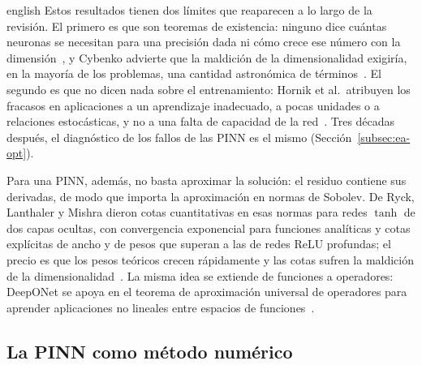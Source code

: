 \documentclass[0000.tex]{subfiles}
\begin{document}
\begin{hyphenrules}{english}
Estos resultados tienen dos límites que reaparecen a lo largo de la revisión. El primero es que son teoremas de existencia: ninguno dice cuántas neuronas se necesitan para una precisión dada ni cómo crece ese número con la dimensión~\cite{hornik1989multilayer,leshno1993multilayer}, y Cybenko advierte que la maldición de la dimensionalidad exigiría, en la mayoría de los problemas, una cantidad astronómica de términos~\cite{cybenko1989approximation}. El segundo es que no dicen nada sobre el entrenamiento: Hornik et al.\ atribuyen los fracasos en aplicaciones a un aprendizaje inadecuado, a pocas unidades o a relaciones estocásticas, y no a una falta de capacidad de la red~\cite{hornik1989multilayer}. Tres décadas después, el diagnóstico de los fallos de las PINN es el mismo (Sección~\ref{subsec:ea-opt}).

Para una PINN, además, no basta aproximar la solución: el residuo contiene sus derivadas, de modo que importa la aproximación en normas de Sobolev. De Ryck, Lanthaler y Mishra dieron cotas cuantitativas en esas normas para redes $\tanh$ de dos capas ocultas, con convergencia exponencial para funciones analíticas y cotas explícitas de ancho y de pesos que superan a las de redes ReLU profundas; el precio es que los pesos teóricos crecen rápidamente y las cotas sufren la maldición de la dimensionalidad~\cite{de2021approximation}. La misma idea se extiende de funciones a operadores: DeepONet se apoya en el teorema de aproximación universal de operadores para aprender aplicaciones no lineales entre espacios de funciones~\cite{lu2019deeponet}.

\subsection{La PINN como método numérico}
\label{subsec:ea-numerico}


\end{hyphenrules}
\end{document}
